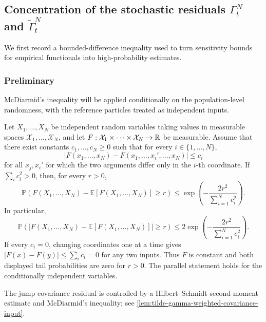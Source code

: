 \subsection{Concentration of the stochastic residuals \(\Gamma_t^N\) and \(\widetilde\Gamma_t^N\)}
\label{subsec:general-argument-bound-stochastic-gamma-and-tilde-gamma}

We first record a bounded-difference inequality used to turn sensitivity bounds
for empirical functionals into high-probability estimates.

\subsubsection{Preliminary}

McDiarmid's inequality will be applied conditionally on the population-level
randomness, with the reference particles treated as independent inputs.

\begin{lemma}
\label{lemma:mcdiarmid}
Let \(X_1,\dots,X_N\) be independent random variables taking values in measurable
spaces \(\mathcal X_1,\dots,\mathcal X_N\), and let
\(
F:\mathcal X_1\times\cdots\times\mathcal X_N\to\mathbb{R}
\)
be measurable.
Assume that there exist constants \(c_1,\dots,c_N\ge0\) such that for every
\(i\in\{1,\dots,N\}\),
\[
|F(x_1,\dots,x_N)-F(x_1,\dots,x_i',\dots,x_N)|
\le c_i
\]
for all \(x_j,x_i'\) for which the two arguments differ only in the \(i\)-th
coordinate.
If $\sum_i c_i^2>0$, then, for every \(r>0\),
\[
\mathbb P\!\left(
F(X_1,\dots,X_N)-\mathbb E[F(X_1,\dots,X_N)] \ge r
\right)
\le
\exp\!\left(
-\frac{2r^2}{\sum_{i=1}^N c_i^2}
\right).
\]
In particular,
\[
\mathbb P\!\left(
|F(X_1,\dots,X_N)-\mathbb E[F(X_1,\dots,X_N)]| \ge r
\right)
\le
2\exp\!\left(
-\frac{2r^2}{\sum_{i=1}^N c_i^2}
\right).
\]
If every $c_i=0$, changing coordinates one at a time gives
$|F(x)-F(y)|\le\sum_i c_i=0$ for any two inputs. Thus $F$ is constant
and both displayed tail probabilities are zero for $r>0$.
The parallel statement holds for the conditionally independent variables.
\end{lemma}

The jump covariance residual is controlled by a Hilbert--Schmidt second-moment estimate and McDiarmid's inequality; see \cref{lem:tilde-gamma-weighted-covariance-input}.




